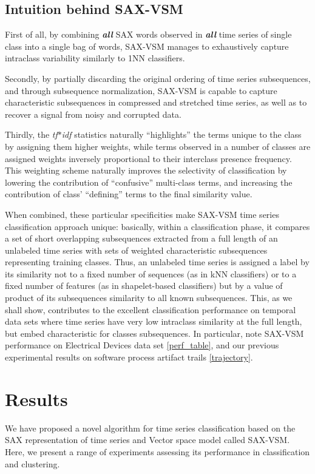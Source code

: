 \documentclass{llncs}
\begin{document}
\subsection{Intuition behind SAX-VSM}
First of all, by combining \textit{\textbf{all}} SAX words observed in \textit{\textbf{all}}
time series of single class into a single bag of words, SAX-VSM manages to exhaustively 
capture intraclass variability similarly to 1NN classifiers.  

Secondly, by partially discarding the original ordering of time series subsequences, and
through subsequence normalization, SAX-VSM is capable to capture characteristic 
subsequences in compressed and stretched time series, as well as to recover a signal 
from noisy and corrupted data. 

Thirdly, the \textit{tf$\ast$idf} statistics naturally ``highlights'' the terms unique to the
class by assigning them higher weights, while terms observed in a number of classes are 
assigned weights inversely proportional to their interclass presence frequency. 
This weighting scheme naturally improves the selectivity of classification 
by  lowering the contribution of ``confusive'' multi-class terms, and  increasing  the 
contribution  of  class' ``defining'' terms to the final similarity value.   

When combined, these particular specificities make SAX-VSM time series classification 
approach unique: basically, within a classification phase, it compares a set of short 
overlapping subsequences extracted from a full length of an unlabeled time series with 
sets of weighted characteristic subsequences representing training classes.
Thus, an unlabeled time series is assigned a label by its similarity not to a fixed number 
of sequences (as in kNN classifiers) or to a fixed number of features (as in shapelet-based 
classifiers) but by a value of product of its subsequences similarity to all known subsequences.
This, as we shall show, contributes to the excellent classification performance on temporal 
data sets where time series have very low intraclass similarity at the full length, but 
embed characteristic for classes subsequences. In particular, note SAX-VSM performance 
on Electrical Devices data set \ref{perf_table}, and our previous experimental results on 
software process artifact trails \ref{trajectory}.
   
\section{Results}
We have proposed a novel algorithm for time series classification based on the SAX
representation of time series and Vector space model called SAX-VSM. Here, we present a range of
experiments assessing its performance in classification and clustering.
\end{document}
